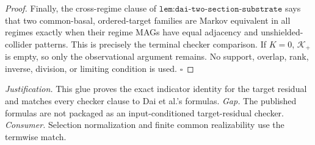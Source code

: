 \documentclass{article}
\begin{document}
\begin{proof}
Finally, the cross-regime clause of \(\texttt{lem:dai-two-section-substrate}\) says that two common-basal, ordered-target families are Markov equivalent in all regimes exactly when their regime MAGs have equal adjacency and unshielded-collider patterns.  This is precisely the terminal checker comparison.  If \(K=0\), \(\mathcal K_+\) is empty, so only the observational argument remains.  No support, overlap, rank, inverse, division, or limiting condition is used. \(\square\)
\end{proof}
\par\smallskip\noindent \textit{Justification.} This glue proves the exact indicator identity for the target residual and matches every checker clause to Dai et al.'s formulas. \textit{Gap.} The published formulas are not packaged as an input-conditioned target-residual checker. \textit{Consumer.} Selection normalization and finite common realizability use the termwise match.
\end{document}
